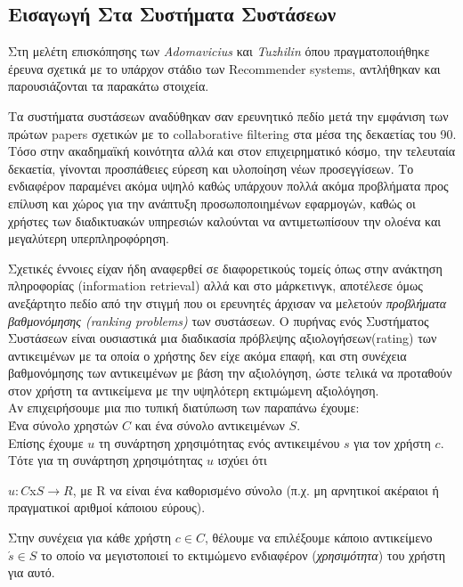 \subsection{Εισαγωγή Στα Συστήματα Συστάσεων}
\noindent
Στη μελέτη επισκόπησης των \emph{Adomavicius} και   \emph{Tuzhilin} \cite{NGRS}  όπου πραγματοποιήθηκε έρευνα σχετικά με το υπάρχον στάδιο 
των  Recommender systems,  αντλήθηκαν και παρουσιάζονται τα παρακάτω στοιχεία.
  
Τα συστήματα συστάσεων αναδύθηκαν σαν ερευνητικό πεδίο μετά την εμφάνιση των πρώτων papers σχετικών με το collaborative filtering στα μέσα της δεκαετίας του 90. 
Τόσο στην ακαδημαϊκή κοινότητα αλλά και στον επιχειρηματικό κόσμο, την τελευταία δεκαετία, γίνονται προσπάθειες εύρεση και υλοποίηση νέων προσεγγίσεων. 
Το ενδιαφέρον παραμένει ακόμα υψηλό καθώς υπάρχουν πολλά ακόμα προβλήματα προς επίλυση και χώρος για την ανάπτυξη προσωποποιημένων εφαρμογών, καθώς οι χρήστες των διαδικτυακών
υπηρεσιών καλούνται να αντιμετωπίσουν την ολοένα και μεγαλύτερη υπερπληροφόρηση.

Σχετικές έννοιες είχαν ήδη αναφερθεί σε διαφορετικούς τομείς όπως στην ανάκτηση 
πληροφορίας (information retrieval) 
αλλά και στο μάρκετινγκ,
αποτέλεσε όμως ανεξάρτητο πεδίο από την στιγμή που οι ερευνητές άρχισαν να μελετούν 
\emph{προβλήματα βαθμονόμησης  (ranking problems)} 
των συστάσεων. 
Ο πυρήνας ενός Συστήματος Συστάσεων είναι ουσιαστικά μια διαδικασία πρόβλεψης
αξιολογήσεων(rating) των αντικειμένων με τα οποία ο χρήστης δεν είχε ακόμα επαφή,
και στη συνέχεια βαθμονόμησης των αντικειμένων με βάση την αξιολόγηση,
ώστε τελικά να προταθούν στον χρήστη τα αντικείμενα με την υψηλότερη εκτιμώμενη αξιολόγηση.\\

Αν επιχειρήσουμε μια πιο τυπική διατύπωση των παραπάνω έχουμε:\\
Ένα σύνολο χρηστών $C$ και ένα σύνολο αντικειμένων $S$. \\
Επίσης έχουμε $u$ τη συνάρτηση χρησιμότητας ενός αντικειμένου $s$ για τον χρήστη $c$.
Τότε για τη συνάρτηση χρησιμότητας $u$ ισχύει ότι 

$u:C$x$S \rightarrow R$,  με R να είναι ένα καθορισμένο σύνολο (π.χ. μη αρνητικοί ακέραιοι ή πραγματικοί αριθμοί κάποιου εύρους).

Στην συνέχεια για κάθε χρήστη $c\in C$, θέλουμε να επιλέξουμε κάποιο αντικείμενο $\acute{s}\in S$ το οποίο να μεγιστοποιεί 
το εκτιμώμενο ενδιαφέρον (\emph{χρησιμότητα}) του χρήστη για αυτό.

